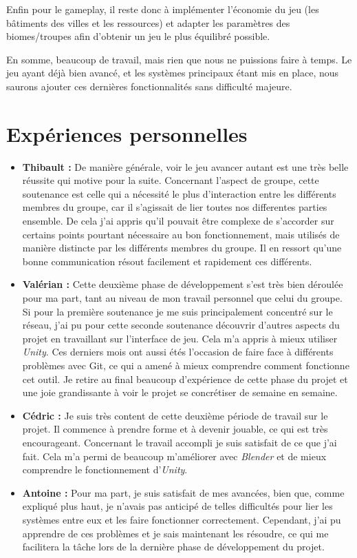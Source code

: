 \documentclass[12pt]{report}
\begin{document}
Enfin pour le gameplay, il reste donc à implémenter l’économie du jeu (les
bâtiments des villes et les ressources) et adapter les paramètres des
biomes/troupes afin d’obtenir un jeu le plus équilibré possible.

En somme, beaucoup de travail, mais rien que nous ne puissions faire à temps. Le
jeu ayant déjà bien avancé, et les systèmes principaux étant mis en place, nous
saurons ajouter ces dernières fonctionnalités sans difficulté majeure.

\chapter{Expériences personnelles}

\begin{itemize}
    \item \textbf{Thibault :} De manière générale, voir le jeu avancer autant
    est une très belle réussite qui motive pour la suite. Concernant l’aspect de
    groupe, cette soutenance est celle qui a nécessité le plus d’interaction
    entre les différents membres du groupe, car il s’agissait de lier toutes nos
    differentes parties ensemble. De cela j’ai appris qu’il pouvait être
    complexe de s’accorder sur certains points pourtant nécessaire au bon
    fonctionnement, mais utilisés de manière distincte par les différents
    membres du groupe. Il en ressort qu’une bonne communication résout
    facilement et rapidement ces différents.
    \item \textbf{Valérian :} Cette deuxième phase de développement s’est très
    bien déroulée pour ma part, tant au niveau de mon travail personnel que
    celui du groupe. Si pour la première soutenance je me suis principalement
    concentré sur le réseau, j’ai pu pour cette seconde soutenance découvrir
    d’autres aspects du projet en travaillant sur l’interface de jeu. Cela m’a
    appris à mieux utiliser \textit{Unity}. Ces derniers mois ont aussi étés
    l’occasion de faire face à différents problèmes avec Git, ce qui a amené à
    mieux comprendre comment fonctionne cet outil. Je retire au final beaucoup
    d’expérience de cette phase du projet et une joie grandissante à voir le
    projet se concrétiser de semaine en semaine.
    \item \textbf{Cédric :} Je suis très content de cette deuxième période de
    travail sur le projet. Il commence à prendre forme et à devenir jouable, ce
    qui est très encourageant. Concernant le travail accompli je suis satisfait
    de ce que j’ai fait. Cela m’a permi de beaucoup m’améliorer avec
    \textit{Blender} et de mieux comprendre le fonctionnement d’\textit{Unity}.
    \item \textbf{Antoine :} Pour ma part, je suis satisfait de mes avancées,
    bien que, comme expliqué plus haut, je n'avais pas anticipé de telles
    difficultés pour lier les systèmes entre eux et les faire fonctionner
    correctement. Cependant, j'ai pu apprendre de ces problèmes et je sais
    maintenant les résoudre, ce qui me facilitera la tâche lors de la dernière
    phase de développement du projet.
\end{itemize}
\end{document}

